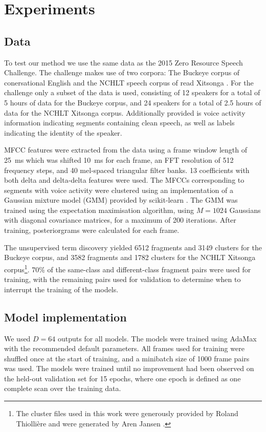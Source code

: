 \section{Experiments}
\label{sec:experiments}

\subsection{Data}
\label{sec:data}

To test our method we use the same data as the 2015 Zero Resource Speech Challenge.
The challenge makes use of two corpora: The Buckeye corpus of conersational English \parencite{buckeyecorpus} and the NCHLT speech corpus of read Xitsonga \parencite{barnard2014nchlt}.
For the challenge only a subset of the data is used, consisting of 12 speakers for a total of 5 hours of data for the Buckeye corpus, and 24 speakers for a total of 2.5 hours of data for the NCHLT Xitsonga corpus.
Additionally provided is voice activity information indicating segments containing clean speech, as well as labels indicating the identity of the speaker.

MFCC features were extracted from the data using a frame window length of \SI{25}{\ms} which was shifted \SI{10}{\ms} for each frame, an FFT resolution of 512 frequency steps, and 40 mel-spaced triangular filter banks.
13 coefficients with both delta and delta-delta features were used.
The MFCCs corresponding to segments with voice activity were clustered using an implementation of a Gaussian mixture model (GMM) provided by scikit-learn \parencite{scikit-learn}.
The GMM was trained using the expectation maximisation algorithm, using $M = 1024$ Gaussians with diagonal covariance matrices, for a maximum of 200 iterations.
After training, posteriorgrams were calculated for each frame.

The unsupervised term discovery yielded 6512 fragments and 3149 clusters for the Buckeye corpus, and 3582 fragments and 1782 clusters for the NCHLT Xitsonga corpus\footnote{The cluster files used in this work were generously provided by Roland Thiollière \parencite{thiolliere2015hybrid} and were generated by Aren Jansen \parencite{jansen2011efficient}.}.
70\% of the same-class and different-class fragment pairs were used for training, with the remaining pairs used for validation to determine when to interrupt the training of the models.

\subsection{Model implementation}
We used $D = 64$ outputs for all models.
The models were trained using AdaMax \parencite{kingma2014adam} with the recommended default parameters.
All frames used for training were shuffled once at the start of training, and a minibatch size of 1000 frame pairs was used.
The models were trained until no improvement had been observed on the held-out validation set for 15 epochs, where one epoch is defined as one complete scan over the training data.

